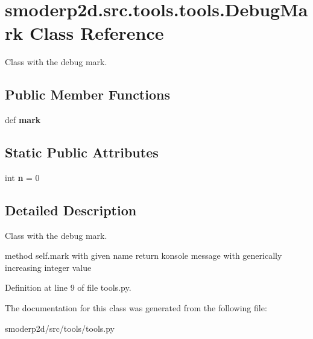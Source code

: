 \hypertarget{classsmoderp2d_1_1src_1_1tools_1_1tools_1_1DebugMark}{\section{smoderp2d.\-src.\-tools.\-tools.\-Debug\-Mark Class Reference}
\label{classsmoderp2d_1_1src_1_1tools_1_1tools_1_1DebugMark}
}


Class with the debug mark.  


\subsection*{Public Member Functions}
\begin{DoxyCompactItemize}
\item 
\hypertarget{classsmoderp2d_1_1src_1_1tools_1_1tools_1_1DebugMark_a8bcee985b3cf188f578d8f7cb3ecd397}{def {\bfseries mark}}\label{classsmoderp2d_1_1src_1_1tools_1_1tools_1_1DebugMark_a8bcee985b3cf188f578d8f7cb3ecd397}

\end{DoxyCompactItemize}
\subsection*{Static Public Attributes}
\begin{DoxyCompactItemize}
\item 
\hypertarget{classsmoderp2d_1_1src_1_1tools_1_1tools_1_1DebugMark_a8b644b7480d760e4870851c64b50a2e6}{int {\bfseries n} = 0}\label{classsmoderp2d_1_1src_1_1tools_1_1tools_1_1DebugMark_a8b644b7480d760e4870851c64b50a2e6}

\end{DoxyCompactItemize}


\subsection{Detailed Description}
Class with the debug mark. 

method self.\-mark with given name return konsole message with generically increasing integer value 

Definition at line 9 of file tools.\-py.



The documentation for this class was generated from the following file\-:\begin{DoxyCompactItemize}
\item 
smoderp2d/src/tools/tools.\-py\end{DoxyCompactItemize}
